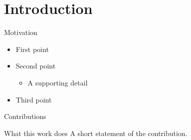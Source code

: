 
\section{Introduction}

\begin{frame}{Motivation}
  \begin{itemize}
    \item First point
    \item Second point
      \begin{itemize}
        \item A supporting detail
      \end{itemize}
    \item Third point
  \end{itemize}
\end{frame}

\begin{frame}{Contributions}
  \begin{block}{What this work does}
    A short statement of the contribution.
  \end{block}
\end{frame}
